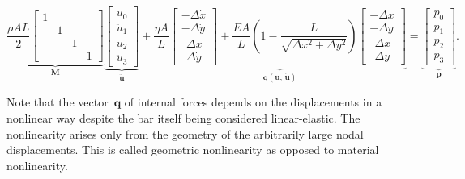 \begin{equation}
\underbrace{
\frac{\rho A L}{2}
\begin{bmatrix}
1\\
& 1\\
&& 1\\
&&& 1
\end{bmatrix}
}_{\boldsymbol{M}}
\underbrace{
\begin{bmatrix}
\ddot{u}_0\\
\ddot{u}_1\\
\ddot{u}_2\\
\ddot{u}_3
\end{bmatrix}
}_{\boldsymbol{\ddot{u}}}
+
\underbrace{
\frac{\eta A}{L}
\begin{bmatrix}
-\Delta \dot{x}\\
-\Delta \dot{y}\\
\ \ \Delta \dot{x}\\
\ \ \Delta \dot{y}
\end{bmatrix}
+
\frac{EA}{L}\left(1 - \frac{L}{\sqrt{\Delta x^2 + \Delta y^2}}\right)
\begin{bmatrix}
-\Delta x\\
-\Delta y\\
\ \ \Delta x\\
\ \ \Delta y
\end{bmatrix}
}_{\boldsymbol{q}(\boldsymbol{u},\,\dot{\boldsymbol{u}})}
=
\underbrace{
\begin{bmatrix}
p_0\\
p_1\\
p_2\\
p_3
\end{bmatrix}
}_{\boldsymbol{p}}.
\end{equation}

Note that the vector~$\boldsymbol{q}$ of internal forces depends on the displacements in a nonlinear way despite the bar itself being considered linear-elastic. The nonlinearity arises only from the geometry of the arbitrarily large nodal displacements. This is called geometric nonlinearity as opposed to material nonlinearity.


